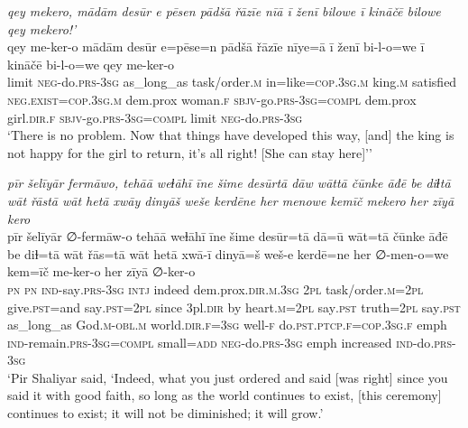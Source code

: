 \ea \label{ŽP.242}
\textit{qey mekero, mādām desūr e pēsen pādšā řāzīe nīā ī ženī bilowe ī kināčē bilowe qey mekero!’} \\ 
\gll qey me-ker-o mādām desūr e=pēse=n pādšā řāzīe nīye=ā ī ženī bi-l-o=we ī kināčē bi-l-o=we qey me-ker-o \\ 
 limit \textsc{neg-}do\textsc{.prs}\textsc{-3sg} as\_long\_as task/order\textsc{.m} in=like\textsc{=cop}\textsc{.3sg}\textsc{.m} king\textsc{.m} satisfied \textsc{\textsc{neg.}exist}\textsc{=cop}\textsc{.3sg}\textsc{.m} dem.prox woman\textsc{.f} \textsc{sbjv-}go\textsc{.prs}\textsc{-3sg}\textsc{=compl} dem.prox girl\textsc{.dir}\textsc{.f} \textsc{sbjv-}go\textsc{.prs}\textsc{-3sg}\textsc{=compl} limit \textsc{neg-}do\textsc{.prs}\textsc{-3sg} \\ 
\glt `There is no problem. Now that things have developed this way, [and] the king is not happy for the girl to return, it’s all right! [She can stay here]’'
\z 
 
\ea \label{ŽP.243}
\textit{pīr šelīyār fermāwo, tehāā weɫāhī īne šime desūrtā dāw wāttā čūnke āđē be diɫtā wāt řāstā wāt hetā xwāy dinyāš weše kerdēne her menowe kemīč mekero her zīyā kero} \\ 
\gll pīr šelīyār ∅-fermāw-o tehāā weɫāhī īne šime desūr=tā dā=ū wāt=tā čūnke āđē be diɫ=tā wāt řās=tā wāt hetā xwā-ī dinyā=š weš-e kerdē=ne her ∅-men-o=we kem=īč me-ker-o her zīyā ∅-ker-o \\ 
 \textsc{pn} \textsc{pn} \textsc{ind-}say\textsc{.prs}\textsc{-3sg} \textsc{intj} indeed dem.prox\textsc{.dir}\textsc{.m}\textsc{.3sg} \textsc{2pl} task/order\textsc{.m}=\textsc{2pl} give\textsc{.pst}=and say\textsc{.pst}=\textsc{2pl} since 3pl\textsc{.dir} by heart\textsc{.m}=\textsc{2pl} say\textsc{.pst} truth=\textsc{2pl} say\textsc{.pst} as\_long\_as God\textsc{.m}\textsc{-obl}\textsc{.m} world\textsc{.dir}\textsc{.f}\textsc{=3sg} well\textsc{-f} do\textsc{.pst}\textsc{.ptcp}\textsc{.f}\textsc{=cop}\textsc{.3sg}\textsc{.f} emph \textsc{ind-}remain\textsc{.prs}\textsc{-3sg}\textsc{=compl} small\textsc{=add} \textsc{neg-}do\textsc{.prs}\textsc{-3sg} emph increased \textsc{ind-}do\textsc{.prs}\textsc{-3sg} \\ 
\glt `Pir Shaliyar said, ‘Indeed, what you just ordered and said [was right] since you said it with good faith, so long as the world continues to exist, [this ceremony] continues to exist; it will not be diminished; it will grow.'
\z 
 

